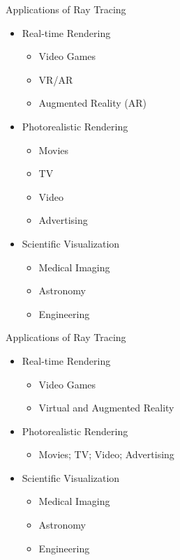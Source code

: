 \documentclass{beamer}
\begin{document}
  \begin{frame}{Applications of Ray Tracing}
    \begin{itemize}
      \item Real-time Rendering
      \begin{itemize}
        \item Video Games
        \item VR/AR
        \item Augmented Reality (AR)
      \end{itemize}
      \item Photorealistic Rendering
      \begin{itemize}
        \item Movies
        \item TV
        \item Video
        \item Advertising
      \end{itemize}
      \item Scientific Visualization
      \begin{itemize}
        \item Medical Imaging
        \item Astronomy
        \item Engineering
      \end{itemize}
    \end{itemize}

  \end{frame}

  \begin{frame}{Applications of Ray Tracing}
    \begin{itemize}
      \item Real-time Rendering
      \begin{itemize}
        \item Video Games
        \item Virtual and Augmented Reality
      \end{itemize}
      \item Photorealistic Rendering
      \begin{itemize}
        \item Movies; TV; Video; Advertising
      \end{itemize}
      \item Scientific Visualization
      \begin{itemize}
        \item Medical Imaging
        \item Astronomy
        \item Engineering
      \end{itemize}
    \end{itemize}

  \end{frame}
\end{document}
